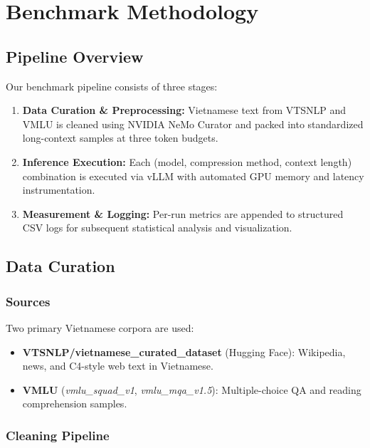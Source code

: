 \documentclass[10pt,twocolumn]{article}
\begin{document}
\section{Benchmark Methodology}
\label{sec:method}

\subsection{Pipeline Overview}

Our benchmark pipeline consists of three stages:

\begin{enumerate}
  \item \textbf{Data Curation \& Preprocessing:}
    Vietnamese text from VTSNLP and VMLU is cleaned using
    NVIDIA NeMo Curator and packed into standardized long-context
    samples at three token budgets.
  \item \textbf{Inference Execution:}
    Each (model, compression method, context length) combination
    is executed via vLLM with automated GPU memory and latency
    instrumentation.
  \item \textbf{Measurement \& Logging:}
    Per-run metrics are appended to structured CSV logs for
    subsequent statistical analysis and visualization.
\end{enumerate}


\subsection{Data Curation}

\subsubsection{Sources}

Two primary Vietnamese corpora are used:
\begin{itemize}
  \item \textbf{VTSNLP/vietnamese\_curated\_dataset} (Hugging Face):
    Wikipedia, news, and C4-style web text in Vietnamese.
  \item \textbf{VMLU} (\textit{vmlu\_squad\_v1}, \textit{vmlu\_mqa\_v1.5}):
    Multiple-choice QA and reading comprehension samples.
\end{itemize}

\subsubsection{Cleaning Pipeline}
\end{document}
